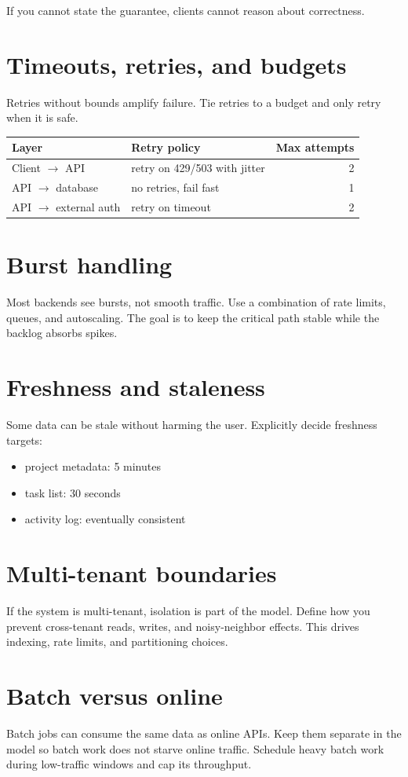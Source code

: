 If you cannot state the guarantee, clients cannot reason about correctness.

\section{Timeouts, retries, and budgets}
Retries without bounds amplify failure.
Tie retries to a budget and only retry when it is safe.

\begin{tabularx}{\textwidth}{@{}lXr@{}}
\toprule
Layer & Retry policy & Max attempts \\
\midrule
Client $\rightarrow$ API & retry on 429/503 with jitter & 2 \\
API $\rightarrow$ database & no retries, fail fast & 1 \\
API $\rightarrow$ external auth & retry on timeout & 2 \\
\bottomrule
\end{tabularx}

\section{Burst handling}
Most backends see bursts, not smooth traffic.
Use a combination of rate limits, queues, and autoscaling.
The goal is to keep the critical path stable while the backlog absorbs spikes.

\section{Freshness and staleness}
Some data can be stale without harming the user.
Explicitly decide freshness targets:
\begin{itemize}[nosep]
  \item project metadata: 5 minutes
  \item task list: 30 seconds
  \item activity log: eventually consistent
\end{itemize}

\section{Multi-tenant boundaries}
If the system is multi-tenant, isolation is part of the model.
Define how you prevent cross-tenant reads, writes, and noisy-neighbor effects.
This drives indexing, rate limits, and partitioning choices.

\section{Batch versus online}
Batch jobs can consume the same data as online APIs.
Keep them separate in the model so batch work does not starve online traffic.
Schedule heavy batch work during low-traffic windows and cap its throughput.

